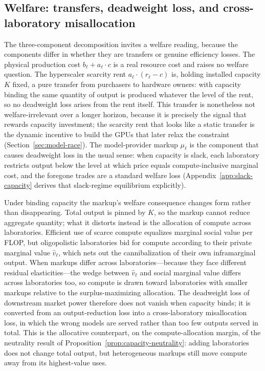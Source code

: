 \documentclass[11pt]{article}
\begin{document}
\subsection{Welfare: transfers, deadweight loss, and cross-laboratory misallocation}
\label{sec:welfare}

The three-component decomposition invites a welfare reading, because the components differ in whether they are transfers or genuine efficiency losses. The physical production cost $b_\ell+a_\ell\cdot c$ is a real resource cost and raises no welfare question. The hyperscaler scarcity rent $a_\ell\cdot(r_\ell-c)$ is, holding installed capacity $K$ fixed, a pure transfer from purchasers to hardware owners: with capacity binding the same quantity of output is produced whatever the level of the rent, so no deadweight loss arises from the rent itself. This transfer is nonetheless not welfare-irrelevant over a longer horizon, because it is precisely the signal that rewards capacity investment; the scarcity rent that looks like a static transfer is the dynamic incentive to build the GPUs that later relax the constraint (Section~\ref{sec:model-race}). The model-provider markup $\mu_\ell$ is the component that causes deadweight loss in the usual sense: when capacity is slack, each laboratory restricts output below the level at which price equals compute-inclusive marginal cost, and the foregone trades are a standard welfare loss (Appendix~\ref{app:slack-capacity} derives that slack-regime equilibrium explicitly).

Under binding capacity the markup's welfare consequence changes form rather than disappearing. Total output is pinned by $K$, so the markup cannot reduce aggregate quantity; what it distorts instead is the allocation of compute across laboratories. Efficient use of scarce compute equalizes marginal social value per FLOP, but oligopolistic laboratories bid for compute according to their private marginal value $\widehat v_\ell$, which nets out the cannibalization of their own inframarginal output. When markups differ across laboratories---because they face different residual elasticities---the wedge between $\widehat v_\ell$ and social marginal value differs across laboratories too, so compute is drawn toward laboratories with smaller markups relative to the surplus-maximizing allocation. The deadweight loss of downstream market power therefore does not vanish when capacity binds; it is converted from an output-reduction loss into a cross-laboratory misallocation loss, in which the wrong models are served rather than too few outputs served in total. This is the allocative counterpart, on the compute-allocation margin, of the neutrality result of Proposition~\ref{prop:capacity-neutrality}: adding laboratories does not change total output, but heterogeneous markups still move compute away from its highest-value uses.
\end{document}
